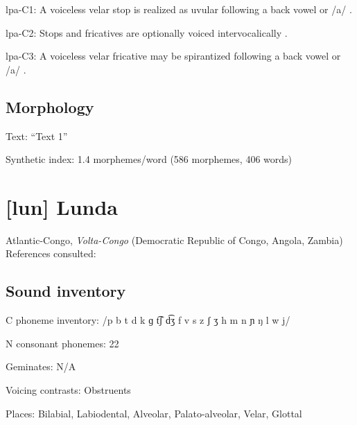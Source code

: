 {\begin{appendixdesc}
\item[lpa-C1:] A voiceless velar stop is realized as uvular following a back vowel or /a/ \citep[19]{Lacrampe2014}.

\item[lpa-C2:] Stops and fricatives are optionally voiced intervocalically \citep[17]{Lacrampe2014}.

\item[lpa-C3:] A voiceless velar fricative may be spirantized following a back vowel or /a/ \citep[20]{Lacrampe2014}.
\end{appendixdesc}
\subsection*{Morphology}

\begin{appendixdesc}

\item[Text:] “Text 1” \citep[495--500]{Lacrampe2014}

\item[Synthetic index:] 1.4 morphemes/word (586 morphemes, 406 words)
\end{appendixdesc}
\section*{[lun] Lunda}  %
Atlantic-Congo, \textit{Volta-Congo} (Democratic Republic of Congo, Angola, Zambia)\medskip\\
References consulted: \citet{Kawasha2003}

\subsection*{Sound inventory}
\begin{appendixdesc}

\item[C phoneme inventory:] /p b t d k ɡ t͡ʃ d͡ʒ f v s z ʃ ʒ h m n ɲ ŋ l w j/

\item[N consonant phonemes:] 22

\item[Geminates:] N/A

\item[Voicing contrasts:] Obstruents

\item[Places:] Bilabial, Labiodental, Alveolar, Palato-alveolar, Velar, Glottal


\end{appendixdesc}}
